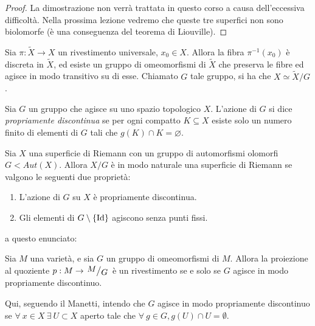 \begin{proof}
La dimostrazione non verrà trattata in questo corso a causa dell'eccessiva difficoltà.
Nella prossima lezione vedremo che queste tre superfici non sono biolomorfe (è una conseguenza del teorema di Liouville).
\end{proof}
\begin{osservazione}
Sia $\pi:\widetilde{X}\rightarrow X$ un rivestimento universale, $x_0\in X$. Allora la fibra $\pi^{-1}(x_0)$ è discreta in $\widetilde{X}$, ed esiste un gruppo di omeomorfismi di $\widetilde{X}$ che preserva le fibre ed agisce in modo transitivo su di esse. Chiamato $G$ tale gruppo, si ha che $X \simeq \widetilde{X}/G$.
\end{osservazione}
\begin{definizione}
Sia $G$ un gruppo che agisce su uno spazio topologico $X$. L'azione di $G$ si dice \textit{propriamente discontinua} se per ogni compatto $K\subseteq X$ esiste solo un numero finito di elementi di $G$ tali che $g(K)\cap K =\varnothing$.
\end{definizione}
\begin{fatto}
Sia $X$ una superficie di Riemann con un gruppo di automorfismi olomorfi $G<Aut(X)$. Allora $X/G$ è in modo naturale una superficie di Riemann se valgono le seguenti due proprietà:
\begin{enumerate}
  \item L'azione di $G$ su $X$ è propriamente discontinua.
  \item Gli elementi di $G\setminus\{\text{Id}\}$ agiscono senza punti fissi.
\end{enumerate}
\end{fatto}



 a questo enunciato:
\begin{teorema}
	Sia $M$ una varietà, e sia $G$ un gruppo di omeomorfismi di $M$.
 	Allora la proiezione al quoziente $p:M\rar \quotient{M}{G}$ è un rivestimento se e solo se $G$ agisce in modo propriamente discontinuo.
\end{teorema}

Qui, seguendo il Manetti, intendo che $G$ agisce in modo propriamente discontinuo se $\forall\ x\in X\ \exists\ U\subset X$ aperto tale che $\forall\ g\in G, g(U)\cap U=\emptyset$.

